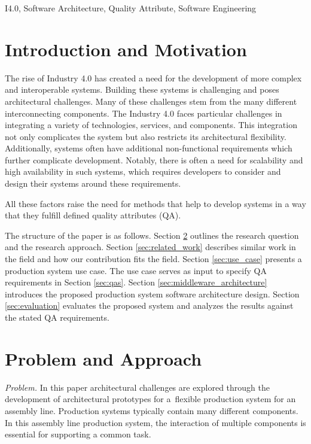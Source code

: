 \documentclass[conference]{IEEEtran}
\begin{document}
\begin{IEEEkeywords}
I4.0, Software Architecture, Quality Attribute, Software Engineering
\end{IEEEkeywords}

\section{Introduction and Motivation}
The rise of Industry 4.0 has created a need for the development of more complex and interoperable systems. Building these systems is challenging and poses architectural challenges. Many of these challenges stem from the many different interconnecting components. The Industry 4.0 faces particular challenges in integrating a variety of technologies, services, and components. This integration not only complicates the system but also restricts its architectural flexibility. Additionally, systems often have additional non-functional requirements which further complicate development. Notably, there is often a need for scalability and high availability in such systems, which requires developers to consider and design their systems around these requirements. 

All these factors raise the need for methods that help to develop systems in a way that they fulfill defined quality attributes (QA).

The structure of the paper is as follows. 
Section \ref{sec:problem} outlines the research question and the research approach. 
Section \ref{sec:related_work} describes similar work in the field and how our contribution fits the field.
Section \ref{sec:use_case} presents a production system use case.
The use case serves as input to specify QA requirements in Section \ref{sec:qas}.
Section \ref{sec:middleware_architecture} introduces the proposed production system software architecture design.
Section \ref{sec:evaluation} evaluates the proposed system and analyzes the results against the stated QA requirements.   

\section{Problem and Approach}

\label{sec:problem}
\emph{Problem.}
In this paper architectural challenges are explored through the development of architectural prototypes for a~flexible production system for an assembly line. Production systems typically contain many different components. In this assembly line production system, the interaction of multiple components is essential for supporting a common task.
\end{document}
